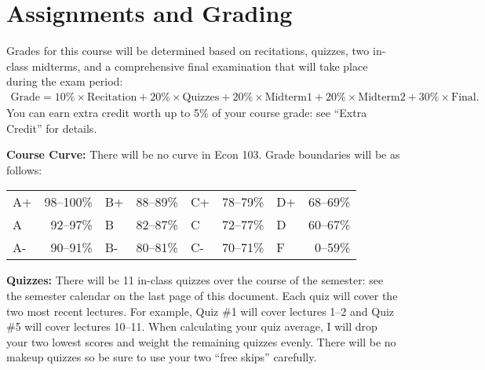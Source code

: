 \documentclass[11pt, letterpaper]{article}
\begin{document}
\section*{Assignments and Grading}

Grades for this course will be determined based on recitations, quizzes, two in-class midterms, and a comprehensive final examination that will take place during the exam period:
	\begin{equation*}
	\begin{split}
    \mbox{Grade} = 10\% \times \mbox{Recitation} + 20\% \times \mbox{Quizzes} + 20\% \times \mbox{Midterm1} + 20\% \times \mbox{Midterm2} + 30\% \times \mbox{Final}.
	\end{split}
	\end{equation*}
You can earn extra credit worth up to 5\% of your course grade: see ``Extra Credit'' for details.

\medskip 

\noindent \textbf{Course Curve:}
There will be no curve in Econ 103.
Grade boundaries will be as follows:
\begin{center}
\begin{tabular}{lr|lr|lr|lr}
  A+ & 98--100\%& B+ & 88--89\% & C+ & 78--79\% & D+ & 68--69\% \\
  A  & 92--97\% & B  & 82--87\% & C  & 72--77\% & D & 60--67\%\\
  A- & 90--91\% & B- & 80--81\% & C- & 70--71\% & F & 0--59\%\\
\end{tabular}
\end{center}

\medskip


\noindent \textbf{Quizzes:} 
There will be 11 in-class quizzes over the course of the semester: see the semester calendar on the last page of this document.
Each quiz will cover the two most recent lectures.
For example, Quiz \#1 will cover lectures 1--2 and Quiz \#5 will cover lectures 10--11.
When calculating your quiz average, I will drop your two lowest scores and weight the remaining quizzes evenly. 
There will be no makeup quizzes so be sure to use your two ``free skips'' carefully.
\end{document}
